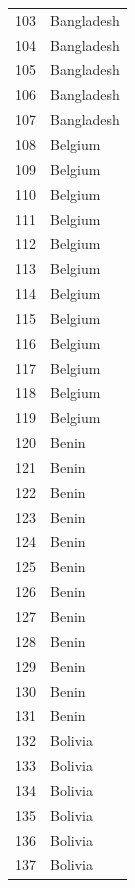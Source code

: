 \documentclass[
  letterpaper,
  DIV=11,
  numbers=noendperiod]{scrreprt}
\begin{document}
\begin{tabular}{ll}
103  &                Bangladesh \\
104  &                Bangladesh \\
105  &                Bangladesh \\
106  &                Bangladesh \\
107  &                Bangladesh \\
108  &                   Belgium \\
109  &                   Belgium \\
110  &                   Belgium \\
111  &                   Belgium \\
112  &                   Belgium \\
113  &                   Belgium \\
114  &                   Belgium \\
115  &                   Belgium \\
116  &                   Belgium \\
117  &                   Belgium \\
118  &                   Belgium \\
119  &                   Belgium \\
120  &                     Benin \\
121  &                     Benin \\
122  &                     Benin \\
123  &                     Benin \\
124  &                     Benin \\
125  &                     Benin \\
126  &                     Benin \\
127  &                     Benin \\
128  &                     Benin \\
129  &                     Benin \\
130  &                     Benin \\
131  &                     Benin \\
132  &                   Bolivia \\
133  &                   Bolivia \\
134  &                   Bolivia \\
135  &                   Bolivia \\
136  &                   Bolivia \\
137  &                   Bolivia \\

\end{tabular}
\end{document}
